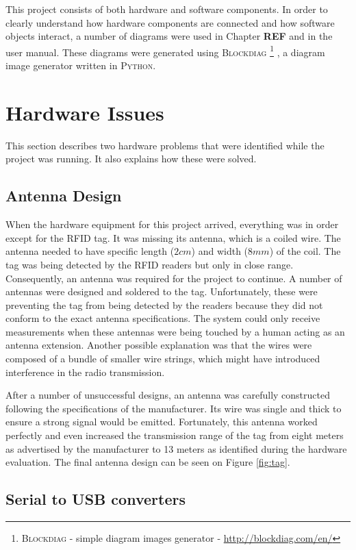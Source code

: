 This project consists of both hardware and software components. In order to clearly understand how hardware components are connected and how software objects interact, a number of diagrams were used in Chapter \textbf{REF} and in the user manual. These diagrams were generated using \textsc{Blockdiag} \footnote{\textsc{Blockdiag} - simple diagram images generator - \url{http://blockdiag.com/en/}} , a diagram image generator written in \textsc{Python}.

\section{Hardware Issues}
\label{sec:hardiss}

This section describes two hardware problems that were identified while the project was running. It also explains how these were solved.

\subsection{Antenna Design}
\label{subsec:antdes}

When the hardware equipment for this project arrived, everything was in order except for the RFID tag. It was missing its antenna, which is a coiled wire. The antenna needed to have specific length ($2cm$) and width ($8mm$) of the coil. The tag was being detected by the RFID readers but only in close range. Consequently, an antenna was required for the project to continue. A number of antennas were designed and soldered to the tag. Unfortunately, these were preventing the tag from being detected by the readers because they did not conform to the exact antenna specifications. The system could only receive measurements when these antennas were being touched by a human acting as an antenna extension. Another possible explanation was that the wires were composed of a bundle of smaller wire strings, which might have introduced interference in the radio transmission.

After a number of unsuccessful designs, an antenna was carefully constructed following the specifications of the manufacturer. Its wire was single and thick to ensure a strong signal would be emitted. Fortunately, this antenna worked perfectly and even increased the transmission range of the tag from eight meters as advertised by the manufacturer to 13 meters as identified during the hardware evaluation. The final antenna design can be seen on Figure \ref{fig:tag}.

\subsection{Serial to USB converters}
\label{subsec:sertousb}

